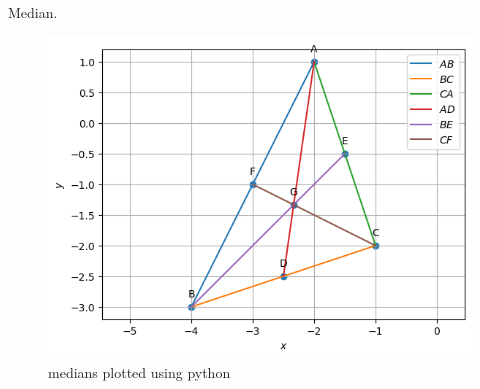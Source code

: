 \begin{table}[H]
        \centering
        
        \caption{Median.}
        \label{tab:Median}
    \end{table}
\begin{figure}[H]
\includegraphics[width=\columnwidth]{1-2/figs/median.png}
\caption{medians plotted using python}
\label{fig:i_median_py}
\end{figure}
